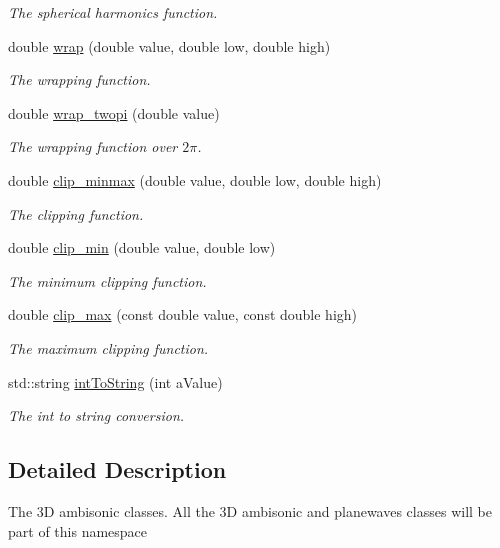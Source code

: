 \begin{DoxyCompactItemize}
\begin{DoxyCompactList}\small\item\em The spherical harmonics function. \end{DoxyCompactList}\item 
double \hyperlink{namespace_hoa3_d_a797e7afd706be7e4c1b5961214991f35}{wrap} (double value, double low, double high)
\begin{DoxyCompactList}\small\item\em The wrapping function. \end{DoxyCompactList}\item 
double \hyperlink{namespace_hoa3_d_a0396e69cca8a7112c6bd1a817fc3ca80}{wrap\-\_\-twopi} (double value)
\begin{DoxyCompactList}\small\item\em The wrapping function over $2\pi$. \end{DoxyCompactList}\item 
double \hyperlink{namespace_hoa3_d_af7d43c71e1aba23d9bff6ffa2db6b95b}{clip\-\_\-minmax} (double value, double low, double high)
\begin{DoxyCompactList}\small\item\em The clipping function. \end{DoxyCompactList}\item 
double \hyperlink{namespace_hoa3_d_a7db8378887542d24d61bed71b482848e}{clip\-\_\-min} (double value, double low)
\begin{DoxyCompactList}\small\item\em The minimum clipping function. \end{DoxyCompactList}\item 
double \hyperlink{namespace_hoa3_d_a6cf3a35e887d29d4b84f0fa38e259317}{clip\-\_\-max} (const double value, const double high)
\begin{DoxyCompactList}\small\item\em The maximum clipping function. \end{DoxyCompactList}\item 
std\-::string \hyperlink{namespace_hoa3_d_ab0c58f51b2b09f1bff39463392da64f7}{int\-To\-String} (int a\-Value)
\begin{DoxyCompactList}\small\item\em The int to string conversion. \end{DoxyCompactList}\end{DoxyCompactItemize}


\subsection{Detailed Description}
The 3\-D ambisonic classes. All the 3\-D ambisonic and planewaves classes will be part of this namespace 

